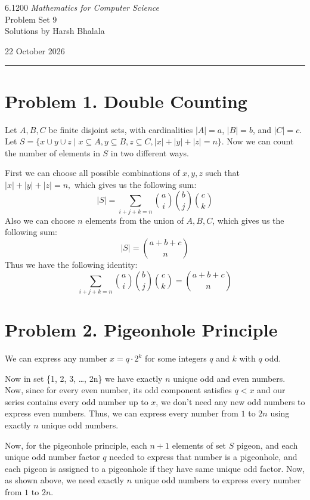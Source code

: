 \documentclass{article}
\begin{document}
\noindent
\begin{minipage}[t]{0.68\textwidth}
{\large 6.1200 \textit{Mathematics for Computer Science}}\\[4pt]
{\large Problem Set 9}\\[4pt]
{\large Solutions by Harsh Bhalala}
\end{minipage}%
\hfill
\begin{minipage}[t]{0.27\textwidth}
\raggedleft
{\large 22 October 2026}
\end{minipage}

\vspace{6pt}

\noindent\rule{\textwidth}{0.5pt}

\section*{Problem 1. Double Counting}

Let $A,B,C$ be finite disjoint sets, with cardinalities $|A|=a$, $|B|=b$, and $|C|=c$. Let $S = \{ x \cup y \cup z\mid x \subseteq A, y \subseteq B, z \subseteq C, |x|+|y|+|z|=n \}$.
Now we can count the number of elements in $S$ in two different ways.

First we can choose all possible combinations of $x,y,z$ such that $|x|+|y|+|z|=n,$ which gives us the following sum:
\[
|S| = \sum_{i+j+k=n} \binom{a}{i}\binom{b}{j}\binom{c}{k}
\]
Also we can choose $n$ elements from the union of $A,B,C$, which gives us the following sum:
\[
|S| = \binom{a+b+c}{n}
\]
Thus we have the following identity:
\[
\sum_{i+j+k=n} \binom{a}{i}\binom{b}{j}\binom{c}{k} = \binom{a+b+c}{n}
\]

\section*{Problem 2. Pigeonhole Principle}
We can express any number $x = q \cdot 2^k$ for some integers $q$ and $k$ with $q$ odd.

Now in set \{1, 2, 3, \dots , 2n\} we have exactly $n$ unique odd and even numbers.
Now, since for every even number, its odd component satisfies $q < x$ and our series contains every odd number up to $ x$, we don't need
any new odd numbers to express even numbers.
Thus, we can express every number from $1$ to $2n$ using exactly $n$ unique odd numbers.

Now, for the pigeonhole principle, each $n+1$ elements of set $S$ pigeon, and each unique odd number factor $q$ needed to express that number is a pigeonhole, and each pigeon is assigned to a pigeonhole if they have
same unique odd factor.
Now, as shown above, we need exactly $n$ unique odd numbers to express every number from $1$ to $2n$.
\end{document}
